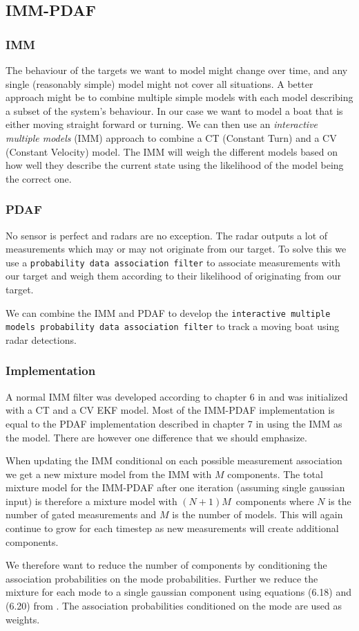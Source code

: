 \subsection{IMM-PDAF}
\subsubsection{IMM}
The behaviour of the targets we want to model might change over time, and any single (reasonably simple) model might not cover all situations. A better approach might be to combine multiple simple models with each model describing a subset of the system's behaviour. In our case we want to model a boat that is either moving straight forward or turning. We can then use an \textit{interactive multiple models} (IMM) approach to combine a CT (Constant Turn) and a CV (Constant Velocity) model. The IMM will weigh the different models based on how well they describe the current state using the likelihood of the model being the correct one.

\subsubsection{PDAF}
No sensor is perfect and radars are no exception. The radar outputs a lot of measurements which may or may not originate from our target. To solve this we use a \texttt{probability data association filter} to associate measurements with our target and weigh them according to their likelihood of originating from our target.

We can combine the IMM and PDAF to develop the \texttt{interactive multiple models probability data association filter} to track a moving boat using radar detections.

\subsubsection{Implementation}
A normal IMM filter was developed according to chapter 6 in \cite{edmund} and was initialized with a CT and a CV EKF model. Most of the IMM-PDAF implementation is equal to the PDAF implementation described in chapter 7 in \cite{edmund} using the IMM as the model. There are however one difference that we should emphasize.

When updating the IMM conditional on each possible measurement association we get a new mixture model from the IMM with $M$ components. The total mixture model for the IMM-PDAF after one iteration (assuming single gaussian input) is therefore a mixture model with $(N+1)M$ components where $N$ is the number of gated measurements and $M$ is the number of models. This will again continue to grow for each timestep as new measurements will create additional components.

We therefore want to reduce the number of components by conditioning the association probabilities on the mode probabilities. Further we reduce the mixture for each mode to a single gaussian component using equations (6.18) and (6.20) from \cite{edmund}. The association probabilities conditioned on the mode are used as weights.



